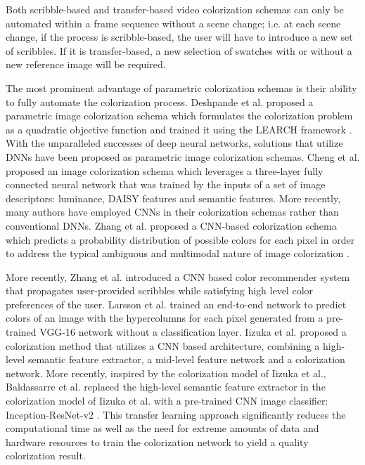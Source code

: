 \documentclass[10pt,twocolumn,letterpaper]{article}
\begin{document}
Both scribble-based and transfer-based video colorization schemas can only be automated within a frame sequence without a scene change; i.e. at each scene change, if the process is scribble-based, the user will have to introduce a new set of scribbles. If it is transfer-based, a new selection of swatches with or without a new reference image will be required. 

The most prominent advantage of parametric colorization schemas is their ability to fully automate the colorization process. Deshpande et al. \cite{7410429} proposed a parametric image colorization schema which formulates the colorization problem as a quadratic objective function and trained it using the LEARCH framework \cite{Ratliff2009}. With the unparalleled successes of deep neural networks, solutions that utilize DNNs have been proposed as parametric image colorization schemas. Cheng et al. \cite{DBLP:journals/corr/ChengYS16} proposed an image colorization schema which leverages a three-layer fully connected neural network that was trained by the inputs of a set of image descriptors: luminance, DAISY features \cite{4587673} and semantic features.  More recently,  many authors have employed CNNs in their colorization schemas rather than conventional DNNs. Zhang et al. \cite{DBLP:journals/corr/ZhangIE16} proposed a CNN-based colorization schema which predicts a probability distribution of possible colors for each pixel in order to address the typical ambiguous and multimodal nature of image colorization \cite{10.1007/978-3-540-88690-7_10}.

More recently, Zhang et al. \cite{DBLP:journals/corr/ZhangZIGLYE17} introduced a CNN based color recommender system that propagates user-provided scribbles while satisfying high level color preferences of the user. Larsson et al. \cite{DBLP:journals/corr/LarssonMS16} trained an end-to-end network to predict colors of an image with the hypercolumns \cite{DBLP:journals/corr/HariharanAGM14a} for each pixel generated from a pre-trained VGG-16 network without a classification layer. Iizuka et al. \cite{Iizuka:2016:LCJ:2897824.2925974} proposed a colorization method that utilizes a CNN based architecture, combining a high-level semantic feature extractor, a mid-level feature network and a colorization network. More recently, inspired by the colorization model of Iizuka et al., Baldassarre et al. \cite{DBLP:journals/corr/abs-1712-03400} replaced the high-level semantic feature extractor in the colorization model of Iizuka et al. with a pre-trained CNN image classifier: Inception-ResNet-v2 \cite{DBLP:journals/corr/SzegedyVISW15}. This transfer learning approach significantly reduces the computational time as well as the need for extreme amounts of data and hardware resources to train the colorization network to yield a quality colorization result.
\end{document}

